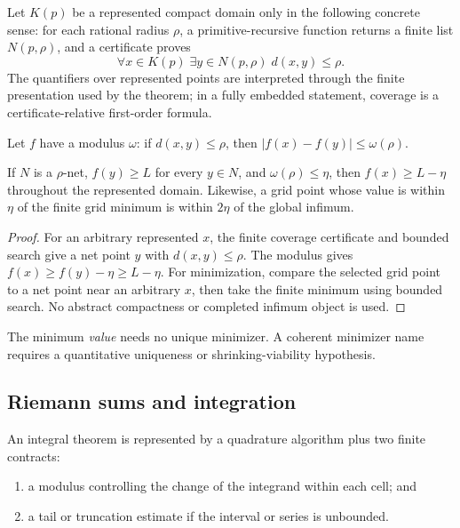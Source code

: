 Let \(K(p)\) be a represented compact domain only in the following concrete
sense: for each rational radius \(\rho\), a primitive-recursive function
returns a finite list \(N(p,\rho)\), and a certificate proves
\[
 \forall x\in K(p)\;\exists y\in N(p,\rho)\; d(x,y)\le\rho.
\]
The quantifiers over represented points are interpreted through the finite
presentation used by the theorem; in a fully embedded statement, coverage is
a certificate-relative first-order formula.

Let \(f\) have a modulus \(\omega\): if \(d(x,y)\le\rho\), then
\(|f(x)-f(y)|\le\omega(\rho)\).

\begin{theorem}
\label{thm:finite-net-transfer}
If \(N\) is a \(\rho\)-net, \(f(y)\ge L\) for every \(y\in N\), and
\(\omega(\rho)\le\eta\), then \(f(x)\ge L-\eta\) throughout the represented
domain.  Likewise, a grid point whose value is within \(\eta\) of the finite
grid minimum is within \(2\eta\) of the global infimum.
\end{theorem}

\begin{proof}
For an arbitrary represented \(x\), the finite coverage certificate and
bounded search give a net point \(y\) with \(d(x,y)\le\rho\).  The modulus
gives \(f(x)\ge f(y)-\eta\ge L-\eta\).  For minimization, compare the selected
grid point to a net point near an arbitrary \(x\), then take the finite minimum
using bounded search.  No abstract compactness or completed infimum object is
used.
\end{proof}

The minimum \emph{value} needs no unique minimizer.  A coherent minimizer name
requires a quantitative uniqueness or shrinking-viability hypothesis.

\subsection{Riemann sums and integration}

An integral theorem is represented by a quadrature algorithm plus two finite
contracts:

\begin{enumerate}
\item a modulus controlling the change of the integrand within each cell; and
\item a tail or truncation estimate if the interval or series is unbounded.
\end{enumerate}

